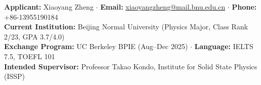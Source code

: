 \documentclass[11pt,a4paper]{article}
\begin{document}
\vspace{0.8em}

\noindent
\textbf{Applicant:} Xiaoyang Zheng $\cdot$ \textbf{Email:} \href{mailto:xiaoyangzheng@mail.bnu.edu.cn}{xiaoyangzheng@mail.bnu.edu.cn} $\cdot$ \textbf{Phone:} +86-13955190184\\
\textbf{Current Institution:} Beijing Normal University (Physics Major, Class Rank 2/23, GPA 3.7/4.0)\\
\textbf{Exchange Program:} UC Berkeley BPIE (Aug--Dec 2025) $\cdot$ \textbf{Language:} IELTS 7.5, TOEFL 101\\
\textbf{Intended Supervisor:} Professor Takao Kondo, Institute for Solid State Physics (ISSP)
\end{document}
